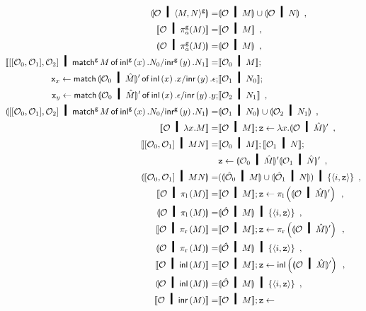 {{\begin{align*}
 \semoi{\hypert\hmid \gpair{M,N}} =&
 \semoi{\hypert\hmid M}\cup \semoi{\hypert\hmid N}\enspace,\\
 \semo{\hypert\hmid \pi_a^\g(M)}=&\semo{\hypert\hmid M}\enspace,\\
 \semoi{\hypert\hmid\pi_a^\g(M)}=&\semoi{\hypert\hmid M}\enspace,\\
  \semo{\cotuple{\cotuple{\hypert_0,\hypert_1},\hypert_2}\hmid
   \gmat  M x {N_0} y {N_1}}
 =&\semo{\hypert_0\hmid M}; \\
  \p{x}_x \leftarrow \lmat {\semoi{\hypert_0\hmid \hat M}'} {x} {x} {y} {\epsilon}; &\semo{\hypert_1 \hmid N_0}; \\
  \p{x}_y \leftarrow \lmat {\semoi{\hypert_0\hmid \hat M}'} {x} {\epsilon} {y} {y}; &\semo{\hypert_2 \hmid N_1}\enspace,\\
  \semoi{\cotuple{\cotuple{\hypert_0,\hypert_1},\hypert_2}\hmid \gmat  M x {N_0} y {N_1}}
 =&\semoi{\hypert_1 \hmid N_0}\cup \semoi{\hypert_2 \hmid N_1}\enspace,\\
 \semo{\hypert\hmid \lambda x.M}=& \semo{\hypert\hmid M}; \p z\leftarrow
 \lambda x. \semoi{\hypert\hmid\hat M}' \enspace,\\
 \semo{\cotuple{\hypert_0,\hypert_1}\hmid MN}=& \semo{\hypert_0\hmid M}; \semo{\hypert_1\hmid N}; \\&
 \p z\leftarrow \semoi{\hypert_0\hmid \hat M}'\semoi{\hypert_1\hmid \hat N}'\enspace,\\
 \semoi{\cotuple{\hypert_0,\hypert_1}\hmid MN} =& (\semoi{\hat \hypert_0 \hmid M}\cup
 \semoi{\hat\hypert_1\hmid N})\hmid \{\tuple{i,\p z}\}\enspace, \\
 \semo{\hypert\hmid \lpil M} =& \semo{\hypert\hmid M}; \p z \leftarrow
 \lpil {\semoi{\hypert\hmid\hat M}'}\enspace, \\
 \semoi{\hypert\hmid \lpil M}=& \semoi{\hat \hypert\hmid M}\hmid
 \{\tuple{i, \p z}\}\enspace, \\
 \semo{\hypert\hmid \lpir M} =& \semo{\hypert\hmid M}; \p z \leftarrow
 \lpir{ \semoi{\hypert\hmid\hat M}' }\enspace, \\
 \semoi{\hypert\hmid \lpir M}=& \semoi{\hat \hypert\hmid M}\hmid
 \{\tuple{i, \p z}\}\enspace, \\
 \semo{\hypert\hmid \linl{M}} =& \semo{\hypert\hmid M}; \p z \leftarrow
 \linl{ \semoi{\hypert\hmid\hat M}'}\enspace, \\
 \semoi{\hypert\hmid \linl M}=& \semoi{\hat \hypert\hmid M}\hmid
 \{\tuple{i, \p z}\}\enspace, \\
 \semo{\hypert\hmid \linr M} =& \semo{\hypert\hmid M}; \p z \leftarrow

\end{align*}}}
